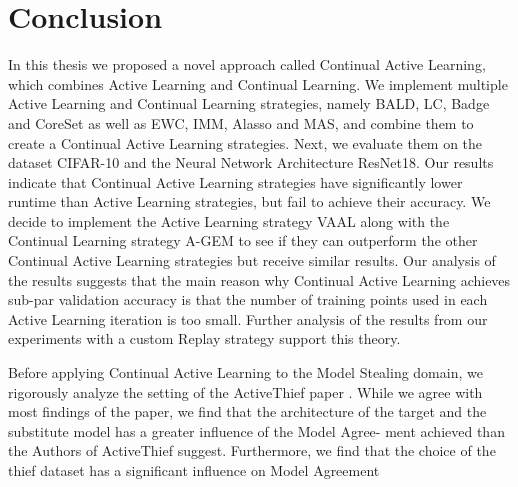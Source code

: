 
\chapter{Conclusion}
\label{ch:Conclusion}
In this thesis we proposed a novel approach called Continual Active Learning, which combines Active Learning and Continual Learning. 
We implement multiple Active Learning and Continual Learning strategies, namely BALD, LC, Badge and CoreSet as well as EWC, IMM, Alasso and MAS,
and combine them to create a Continual Active Learning strategies. Next, we evaluate them on the dataset CIFAR-10 and the Neural Network Architecture
ResNet18. Our results indicate that Continual Active Learning strategies have significantly lower runtime than Active Learning strategies, but fail
to achieve their accuracy. We decide to implement the Active Learning strategy VAAL along with the Continual Learning strategy A-GEM to see if they
can outperform the other Continual Active Learning strategies but receive similar results. Our analysis of the results suggests that the main reason
why Continual Active Learning achieves sub-par validation accuracy is that the number of training points used in each Active Learning iteration is too
small. Further analysis of the results from our experiments with a custom Replay strategy support this theory. \par
Before applying Continual Active Learning to the Model Stealing domain, we rigorously analyze the setting of the ActiveThief paper \cite{pal2020activethief}.
While we agree with most findings of the paper, we find that the architecture of the target and the substitute model has a greater influence of the Model Agree-
ment achieved than the Authors of ActiveThief suggest. Furthermore, we find that the choice of the thief dataset has a significant influence on Model Agreement
